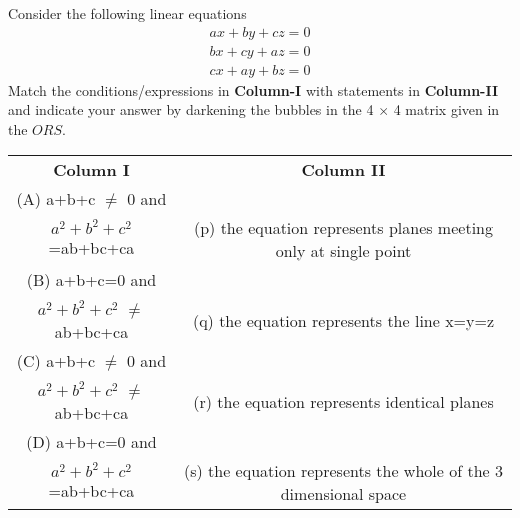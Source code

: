 \item Consider the following linear equations
\begin{align*}
ax+by+cz=0
\end{align*}
\begin{align*}
bx+cy+az=0
\end{align*}
\begin{align*}
cx+ay+bz=0
\end{align*}
Match the conditions/expressions in \textbf{Column-I} with statements in \textbf{Column-II} and indicate your answer by darkening the bubbles in the 4 $\times$ 4 matrix given in the $ORS$.
\begin{table}[ht!]
\centering
\begin{tabular}{c c} 
 \textbf{Column I} & \textbf{Column II}\\ [0.5ex] 
 (A) a+b+c $\neq$ 0 and\\
     $a^2+b^2+c^2$=ab+bc+ca                             &(p) the equation represents planes meeting 
                                                             only at single point\\ 
 (B) a+b+c=0 and\\
  $a^2+b^2+c^2$ $\neq$ ab+bc+ca                         &(q) the equation represents the line x=y=z\\
 (C) a+b+c $\neq$ 0 and\\
  $a^2+b^2+c^2$ $\neq$ ab+bc+ca                         &(r) the equation represents identical planes\\
 (D) a+b+c=0 and\\
  $a^2+b^2+c^2$=ab+bc+ca                                &(s) the equation represents the whole of the 
                                                             3 dimensional space\\[1ex] 
\end{tabular}
\end{table}

